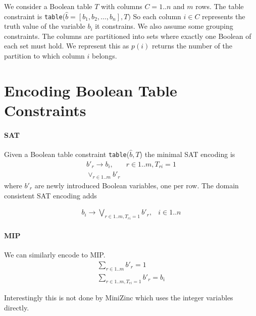 \documentclass{article}
\begin{document}
We consider a Boolean table $T$ 
with columns $C = 1..n$ and $m$ rows.
The table constraint is \texttt{table}($\hat{b} = [b_1, b_2, \ldots, b_n], T)$
So each column $i \in C$ represents the truth value of the variable $b_i$ it constrains.
We also assume some grouping constraints. The columns are partitioned into sets where exactly one Boolean of each set must hold.  We represent this as $p(i)$ returns the number of the partition to which column $i$ belongs. 

\section{Encoding Boolean Table Constraints}

\paragraph{SAT}
Given a Boolean table constraint 
\texttt{table}($\hat{b},T$) 
 the minimal SAT encoding is
$$
\begin{array}{rl}
b'_r \rightarrow b_i, & r \in 1..m, T_{ri} = 1 \\
\vee_{r \in 1..m} b'_r
\end{array}
$$
where $b'_r$ are newly introduced Boolean variables, one per row. The domain consistent SAT encoding adds

$$
\begin{array}{rl}
b_i \rightarrow \bigvee_{r \in 1..m, T_{ri} = 1} b'_r, & i \in 1..n 
\end{array}
$$
\paragraph{MIP}
We can similarly encode to MIP.
$$
\begin{array}{rl}
\sum_{r \in 1..m} b'_r = 1 \\
\sum_{r \in 1..m, T_{ri} = 1} b'_r = b_i
\end{array}
$$

Interestingly this is not done by MiniZinc which uses the integer variables directly.
\end{document}
